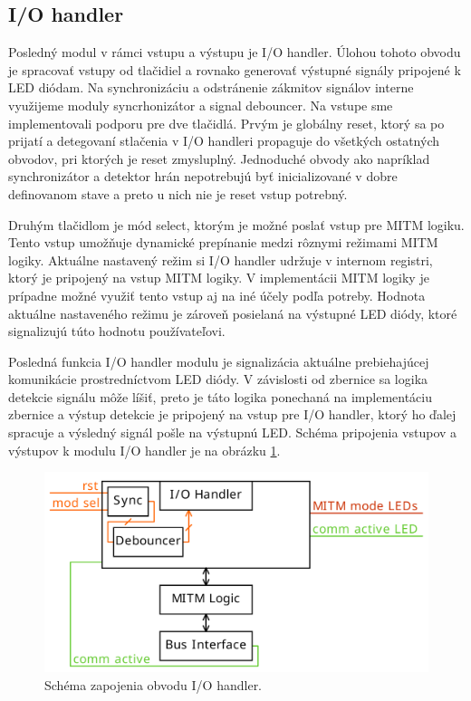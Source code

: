 \subsection{I/O handler}
Posledný modul v rámci vstupu a výstupu je I/O handler. Úlohou tohoto obvodu je spracovať vstupy od tlačidiel a rovnako generovať výstupné signály pripojené k LED diódam. Na synchronizáciu a odstránenie zákmitov signálov interne využijeme moduly syncrhonizátor a signal debouncer.  Na vstupe sme implementovali podporu pre dve tlačidlá. Prvým je globálny reset, ktorý sa po prijatí a detegovaní stlačenia v I/O handleri propaguje do všetkých ostatných obvodov, pri ktorých je reset zmysluplný. Jednoduché obvody ako napríklad synchronizátor a detektor hrán nepotrebujú byť inicializované v dobre definovanom stave a preto u nich nie je reset vstup potrebný.

Druhým tlačidlom je mód select, ktorým je možné poslať vstup pre MITM logiku. Tento vstup umožňuje dynamické prepínanie medzi rôznymi režimami MITM logiky. Aktuálne nastavený režim si I/O handler udržuje v internom registri, ktorý je pripojený na vstup MITM logiky. V implementácii MITM logiky je prípadne možné využiť tento vstup aj na iné účely podľa potreby. Hodnota aktuálne nastaveného režimu je zároveň posielaná na výstupné LED diódy, ktoré signalizujú túto hodnotu používateľovi.

Posledná funkcia I/O handler modulu je signalizácia aktuálne prebiehajúcej komunikácie prostredníctvom LED diódy. V závislosti od zbernice sa logika detekcie signálu môže líšiť, preto je táto logika ponechaná na implementáciu zbernice a výstup detekcie je pripojený na vstup pre I/O handler, ktorý ho ďalej spracuje a výsledný signál pošle na výstupnú LED. Schéma pripojenia vstupov a výstupov k modulu I/O handler je na obrázku \ref{obr:ioHandler}.

\begin{figure}
    \centerline{\includegraphics[width=1\textwidth]{images/designs/ioHandler.pdf}}
    \caption[Schéma zapojenia obvodu I/O handler]{Schéma zapojenia obvodu I/O handler.}
    \label{obr:ioHandler}
\end{figure}

